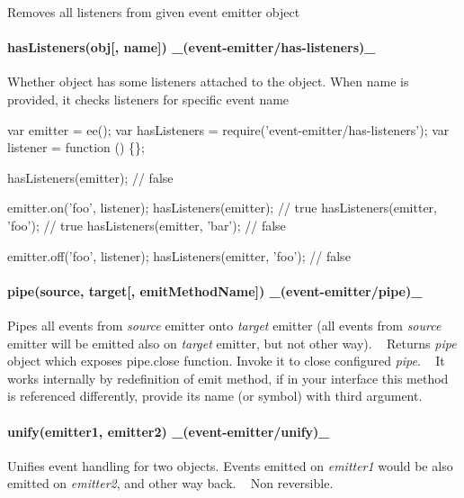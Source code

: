 Removes all listeners from given event emitter object

\paragraph*{has\+Listeners(obj\mbox{[}, name\mbox{]}) \+\_\+(event-\/emitter/has-\/listeners)\+\_\+}

Whether object has some listeners attached to the object. When {\ttfamily name} is provided, it checks listeners for specific event name


\begin{DoxyCode}
var emitter = ee();
var hasListeners = require('event-emitter/has-listeners');
var listener = function () \{\};

hasListeners(emitter); // false

emitter.on('foo', listener);
hasListeners(emitter); // true
hasListeners(emitter, 'foo'); // true
hasListeners(emitter, 'bar'); // false

emitter.off('foo', listener);
hasListeners(emitter, 'foo'); // false
\end{DoxyCode}


\paragraph*{pipe(source, target\mbox{[}, emit\+Method\+Name\mbox{]}) \+\_\+(event-\/emitter/pipe)\+\_\+}

Pipes all events from {\itshape source} emitter onto {\itshape target} emitter (all events from {\itshape source} emitter will be emitted also on {\itshape target} emitter, but not other way). ~\newline
Returns {\itshape pipe} object which exposes {\ttfamily pipe.\+close} function. Invoke it to close configured {\itshape pipe}. ~\newline
It works internally by redefinition of {\ttfamily emit} method, if in your interface this method is referenced differently, provide its name (or symbol) with third argument.

\paragraph*{unify(emitter1, emitter2) \+\_\+(event-\/emitter/unify)\+\_\+}

Unifies event handling for two objects. Events emitted on {\itshape emitter1} would be also emitted on {\itshape emitter2}, and other way back. ~\newline
Non reversible.


